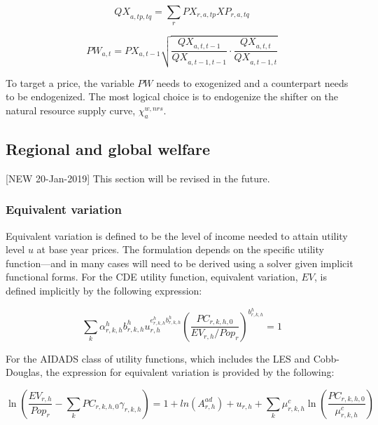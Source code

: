 \documentclass[11pt,letterpaper]{report}
\begin{document}
\[
\mathit{QX}_{a,\mathit{tp},\mathit{tq}}
   = \sum_r{\mathit{PX}_{r,a,\mathit{tp}} \mathit{XP}_{r,a,\mathit{tq}}}
\]

\begin{equation}
\label{eq:pw}
\mathit{PW}_{a,t} = \mathit{PX}_{a,t-1} \sqrt{
   \frac {\mathit{QX}_{a,\mathit{t},   \mathit{t-1}}}
         {\mathit{QX}_{a,\mathit{t-1}, \mathit{t-1}}} \cdot
   \frac {\mathit{QX}_{a,\mathit{t},   \mathit{t}}}
         {\mathit{QX}_{a,\mathit{t-1}, \mathit{t}}} }
\end{equation}

To target a price, the variable $\mathit{PW}$ needs to exogenized and a
counterpart needs to be endogenized. The most logical choice is to endogenize
the shifter on the natural resource supply curve, $\chi^{w,\mathit{nrs}}_a$.

\subsection{Regional and global welfare}

[NEW 20-Jan-2019] This section will be revised in the future.

\subsubsection{Equivalent variation}

Equivalent variation is defined to be the level of income needed to attain
utility level $u$ at base year prices. The formulation depends on the
specific utility function---and in many cases will need to be
derived using a solver given implicit functional forms. For the CDE
utility function, equivalent variation, $\mathit{EV}$, is defined implicitly
by the following expression:

\begin{equation}
\label{eq:EVCDE}
\sum_k{\alpha^h_{r,k,h} b^h_{r,k,h} u_{r,h}^{e^h_{r,k,h} b^h_{r,k,h}} {\left(
      \frac{\mathit{PC}_{r,k,h,0}} {\mathit{EV}_{r,h}/\mathit{Pop}_r}
    \right)}^{b^h_{r,k,h}}} = 1
\end{equation}

For the AIDADS class of utility functions, which includes the LES
and Cobb-Douglas, the expression for equivalent variation is provided
by the following:

\begin{equation}
\label{eq:EVAIDADS}
\ln\left(\frac{\mathit{EV}_{r,h}}{\mathit{Pop}_r} -
\sum_k{\mathit{PC}_{r,k,h,0}\gamma_{r,k,h}}\right) =
1 + ln\left(A^{\mathit{ad}}_{r,h}\right)
+ u_{r,h} + \sum_k{\mu^c_{r,k,h} \ln\left(\frac{\mathit{PC}_{r,k,h,0}}{\mu^c_{r,k,h}} \right)}
\end{equation}
\end{document}
